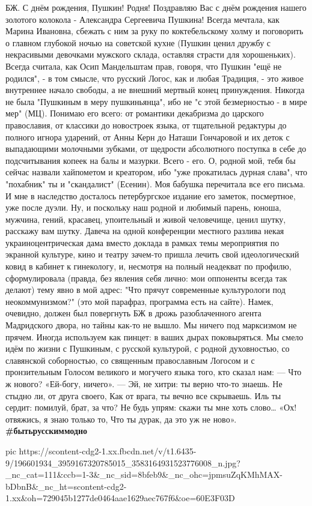 БЖ. С днём рождения, Пушкин!
Родня! Поздравляю Вас с днём рождения нашего золотого колокола - Александра Сергеевича Пушкина! Всегда мечтала, как Марина Ивановна, сбежать с ним за руку по коктебельскому холму и поговорить о главном глубокой ночью на советской кухне (Пушкин ценил дружбу с некрасивыми девочками мужского склада, оставляя страсти для хорошеньких). Всегда считала, как Осип Мандельштам прав, говоря, что Пушкин "ещё не родился", - в том смысле, что русский Логос, как и любая Традиция, - это живое внутреннее начало свободы, а не внешний мертвый конец принуждения. Никогда не была "Пушкиным в меру пушкиньянца", ибо не "с этой безмерностью - в мире мер" (МЦ). Понимаю его всего: от романтики декабризма до царского православия, от классики до новостроек языка, от тщательной редактуры до полного игнора ударений, от Анны Керн до Наташи Гончаровой и их деток с выпадающими молочными зубками, от щедрости абсолютного поступка в себе до подсчитывания копеек на балы и мазурки. Всего - его. О, родной мой, тебя бы сейчас назвали хайпометом и креатором, ибо "уже прокатилась дурная слава", что "похабник" ты и "скандалист" (Есенин).
Моя бабушка перечитала все его письма. И мне в наследство досталось петербургское издание его заметок, посмертное, уже после дуэли.
Ну, и поскольку наш родной и любимый парень, юноша, мужчина, гений, красавец, упоительный и живой человечище, ценил шутку, расскажу вам шутку. Давеча на одной конференции местного разлива некая украиноцентрическая дама вместо доклада в рамках темы мероприятия по экранной культуре, кино и театру зачем-то пришла лечить свой идеологический ковид в кабинет к гинекологу, и, несмотря на полный неадекват по профилю, сформулировала (правда, без явления себя лично: мои оппоненты всегда так делают) тему явно в мой адрес: "Что прячут современные культурологи под неокоммунизмом?" (это мой парафраз, программа есть на сайте).
Намек, очевидно, должен был повергнуть БЖ в дрожь разоблаченного агента Мадридского двора, но тайны как-то не вышло. Мы ничего под марксизмом не прячем. Иногда используем как пинцет: в ваших дырах поковыряться. Мы смело идём по жизни с Пушкиным, с русской культурой, с родной духовностью, со славянской соборностью, со священным православным Логосом и с пронзительным Голосом великого и могучего языка того, кто сказал нам:
— Что ж нового? «Ей-богу, ничего».
— Эй, не хитри: ты верно что-то знаешь.
Не стыдно ли, от друга своего,
Как от врага, ты вечно все скрываешь.
Иль ты сердит: помилуй, брат, за что?
Не будь упрям: скажи ты мне хоть слово…
«Ох! отвяжись, я знаю только то,
Что ты дурак, да это уж не ново».
\textbf{#бытьрусскиммодно}

\ifcmt
  pic https://scontent-cdg2-1.xx.fbcdn.net/v/t1.6435-9/196601934_3959167320785015_3583164931523776008_n.jpg?_nc_cat=111&ccb=1-3&_nc_sid=8bfeb9&_nc_ohc=jpmsuZqKMhMAX-bDbnB&_nc_ht=scontent-cdg2-1.xx&oh=729045b1277de0464aae1629aec767f6&oe=60E3F03D
\fi

